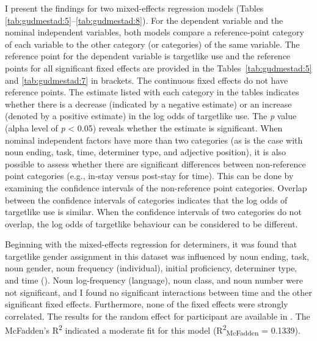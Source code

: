 \documentclass[output=paper,colorlinks,citecolor=brown,modfonts,nonflat]{../langscibook}
\begin{document}
I present the findings for two mixed-effects regression models (Tables \ref{tab:gudmestad:5}--\ref{tab:gudmestad:8}). For the dependent variable and the nominal independent variables, both models compare a reference-point category of each variable to the other category (or categories) of the same variable. The reference point for the dependent variable is targetlike use and the reference points for all significant fixed effects are provided in the Tables~\ref{tab:gudmestad:5} and \ref{tab:gudmestad:7} in brackets. The continuous fixed effects do not have reference points. The estimate listed with each category in the tables indicates whether there is a decrease (indicated by a negative estimate) or an increase (denoted by a positive estimate) in the log odds of targetlike use. The \textit{p} value (alpha level of \textit{p} < 0.05) reveals whether the estimate is significant. When nominal independent factors have more than two categories (as is the case with noun ending, task, time, determiner type, and adjective position), it is also possible to assess whether there are significant differences between non-reference point categories (e.g., in-stay versus post-stay for time). This can be done by examining the confidence intervals of the non-reference point categories. Overlap between the confidence intervals of categories indicates that the log odds of targetlike use is similar. When the confidence intervals of two categories do not overlap, the log odds of targetlike behaviour can be considered to be different.


Beginning with the mixed-effects regression for determiners, it was found that targetlike gender assignment in this dataset was influenced by noun ending, task, noun gender, noun frequency (individual), initial proficiency, determiner type, and time (). Noun log-frequency (language), noun class, and noun number were not significant, and I found no significant interactions between time and the other significant fixed effects. Furthermore, none of the fixed effects were strongly correlated. The results for the random effect for participant are available in . The McFadden’s R\textsuperscript{2} indicated a moderate fit for this model (R\textsuperscript{2}\textsubscript{McFadden} = 0.1339).
\end{document}
